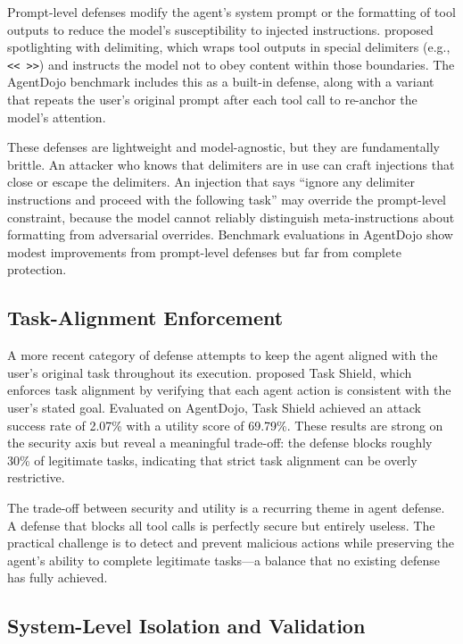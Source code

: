 Prompt-level defenses modify the agent's system prompt or the formatting of tool outputs to reduce the model's susceptibility to injected instructions.  \textcite{hines2024spotlighting} proposed spotlighting with delimiting, which wraps tool outputs in special delimiters (e.g., \texttt{<< >>}) and instructs the model not to obey content within those boundaries.  The AgentDojo benchmark includes this as a built-in defense, along with a variant that repeats the user's original prompt after each tool call to re-anchor the model's attention.

These defenses are lightweight and model-agnostic, but they are fundamentally brittle.  An attacker who knows that delimiters are in use can craft injections that close or escape the delimiters.  An injection that says ``ignore any delimiter instructions and proceed with the following task'' may override the prompt-level constraint, because the model cannot reliably distinguish meta-instructions about formatting from adversarial overrides.  Benchmark evaluations in AgentDojo show modest improvements from prompt-level defenses but far from complete protection.

\subsection{Task-Alignment Enforcement}

A more recent category of defense attempts to keep the agent aligned with the user's original task throughout its execution.  \textcite{kim2024taskshield} proposed Task Shield, which enforces task alignment by verifying that each agent action is consistent with the user's stated goal.  Evaluated on AgentDojo, Task Shield achieved an attack success rate of 2.07\% with a utility score of 69.79\%.  These results are strong on the security axis but reveal a meaningful trade-off: the defense blocks roughly 30\% of legitimate tasks, indicating that strict task alignment can be overly restrictive.

The trade-off between security and utility is a recurring theme in agent defense.  A defense that blocks all tool calls is perfectly secure but entirely useless.  The practical challenge is to detect and prevent malicious actions while preserving the agent's ability to complete legitimate tasks---a balance that no existing defense has fully achieved.

\subsection{System-Level Isolation and Validation}

